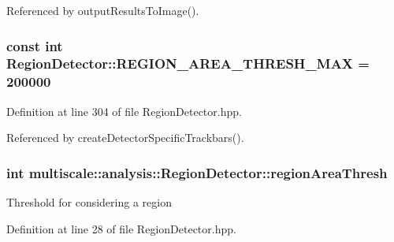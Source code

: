 \-Referenced by output\-Results\-To\-Image().

\hypertarget{classmultiscale_1_1analysis_1_1RegionDetector_a8a301bd841d376448aff4a0c4d0a1485}{
\subsubsection[{\-R\-E\-G\-I\-O\-N\-\_\-\-A\-R\-E\-A\-\_\-\-T\-H\-R\-E\-S\-H\-\_\-\-M\-A\-X}]{\setlength{\rightskip}{0pt plus 5cm}const int {\bf \-Region\-Detector\-::\-R\-E\-G\-I\-O\-N\-\_\-\-A\-R\-E\-A\-\_\-\-T\-H\-R\-E\-S\-H\-\_\-\-M\-A\-X} = 200000}}\label{classmultiscale_1_1analysis_1_1RegionDetector_a8a301bd841d376448aff4a0c4d0a1485}


\-Definition at line 304 of file \-Region\-Detector.\-hpp.



\-Referenced by create\-Detector\-Specific\-Trackbars().

\hypertarget{classmultiscale_1_1analysis_1_1RegionDetector_a1f637073a3d946d000dceed01412f19a}{
\subsubsection[{region\-Area\-Thresh}]{\setlength{\rightskip}{0pt plus 5cm}int {\bf multiscale\-::analysis\-::\-Region\-Detector\-::region\-Area\-Thresh}}}\label{classmultiscale_1_1analysis_1_1RegionDetector_a1f637073a3d946d000dceed01412f19a}
\-Threshold for considering a region 

\-Definition at line 28 of file \-Region\-Detector.\-hpp.



